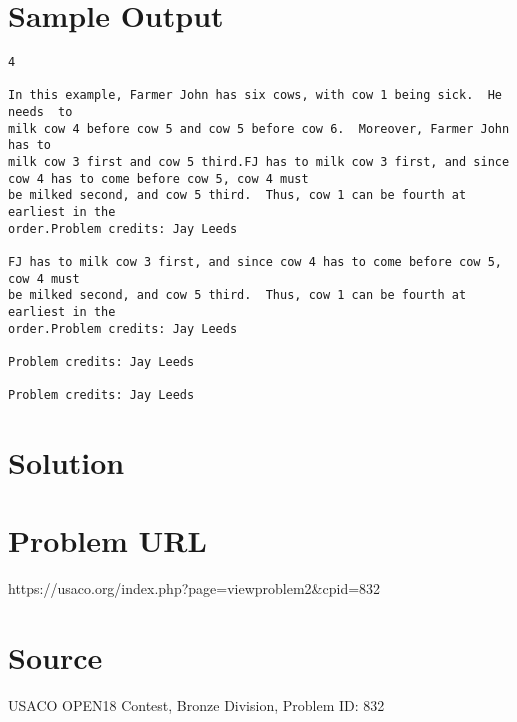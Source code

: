 \documentclass[12pt]{article}
\begin{document}
\section*{Sample Output}
\begin{verbatim}
4

In this example, Farmer John has six cows, with cow 1 being sick.  He needs  to
milk cow 4 before cow 5 and cow 5 before cow 6.  Moreover, Farmer John has to
milk cow 3 first and cow 5 third.FJ has to milk cow 3 first, and since cow 4 has to come before cow 5, cow 4 must
be milked second, and cow 5 third.  Thus, cow 1 can be fourth at earliest in the
order.Problem credits: Jay Leeds

FJ has to milk cow 3 first, and since cow 4 has to come before cow 5, cow 4 must
be milked second, and cow 5 third.  Thus, cow 1 can be fourth at earliest in the
order.Problem credits: Jay Leeds

Problem credits: Jay Leeds

Problem credits: Jay Leeds
\end{verbatim}

\section*{Solution}


\section*{Problem URL}
https://usaco.org/index.php?page=viewproblem2&cpid=832

\section*{Source}
USACO OPEN18 Contest, Bronze Division, Problem ID: 832
\end{document}

